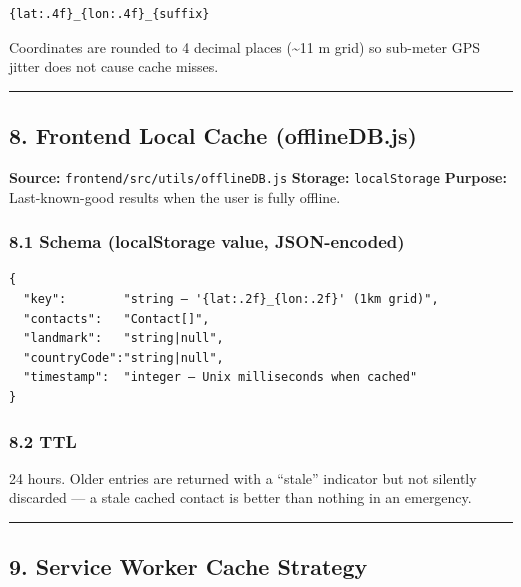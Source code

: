 \begin{verbatim}
{lat:.4f}_{lon:.4f}_{suffix}
\end{verbatim}

Coordinates are rounded to 4 decimal places (\textasciitilde11 m grid)
so sub-meter GPS jitter does not cause cache misses.

\begin{center}\rule{0.5\linewidth}{0.5pt}\end{center}

\hypertarget{frontend-local-cache-offlinedb.js}{%
\subsection{8. Frontend Local Cache
(offlineDB.js)}\label{frontend-local-cache-offlinedb.js}}

\textbf{Source:} \texttt{frontend/src/utils/offlineDB.js}
\textbf{Storage:} \texttt{localStorage} \textbf{Purpose:}
Last-known-good results when the user is fully offline.

\hypertarget{schema-localstorage-value-json-encoded}{%
\subsubsection{8.1 Schema (localStorage value,
JSON-encoded)}\label{schema-localstorage-value-json-encoded}}

\begin{verbatim}
{
  "key":        "string — '{lat:.2f}_{lon:.2f}' (1km grid)",
  "contacts":   "Contact[]",
  "landmark":   "string|null",
  "countryCode":"string|null",
  "timestamp":  "integer — Unix milliseconds when cached"
}
\end{verbatim}

\hypertarget{ttl}{%
\subsubsection{8.2 TTL}\label{ttl}}

24 hours. Older entries are returned with a ``stale'' indicator but not
silently discarded --- a stale cached contact is better than nothing in
an emergency.

\begin{center}\rule{0.5\linewidth}{0.5pt}\end{center}

\hypertarget{service-worker-cache-strategy}{%
\subsection{9. Service Worker Cache
Strategy}\label{service-worker-cache-strategy}}

